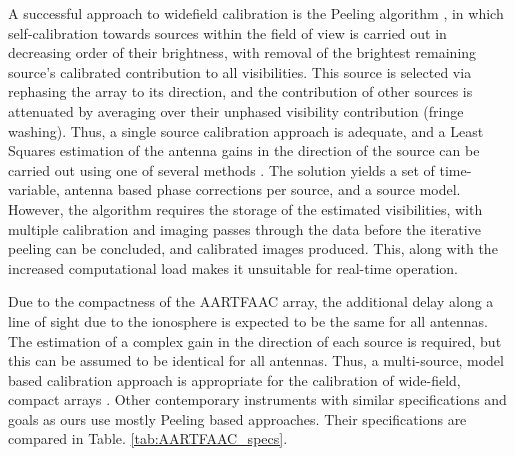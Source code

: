 \documentclass{aa}
\begin{document}
A  successful  approach  to  widefield  calibration  is  the  Peeling  algorithm
\citep{noordam2004peel,vdTol2007selfcallofar}, in which self-calibration towards
sources within  the field of  view is carried  out in decreasing order  of their
brightness,  with  removal  of   the  brightest  remaining  source's  calibrated
contribution  to all  visibilities. This  source is  selected via  rephasing the
array to its  direction, and the contribution of other  sources is attenuated by
averaging over their unphased  visibility contribution (fringe washing). Thus, a
single source calibration  approach is adequate, and a  Least Squares estimation
of the antenna gains in the direction of the source can be carried out using one
of  several  methods \citep{boonstra2003gain}.  The  solution  yields  a set  of
time-variable,  antenna  based  phase  corrections  per  source,  and  a  source
model.   However,  the  algorithm   requires  the   storage  of   the  estimated
visibilities,  with multiple  calibration and  imaging passes  through  the data
before  the   iterative  peeling  can   be  concluded,  and   calibrated  images
produced. This, along with the  increased computational load makes it unsuitable
for real-time operation.

Due to the compactness of the  AARTFAAC array, the additional delay along a line
of sight due to the ionosphere is  expected to be the same for all antennas. The
estimation of  a complex gain in the  direction of each source  is required, but
this can  be assumed  to be  identical for all  antennas. Thus,  a multi-source,
model  based  calibration  approach   is  appropriate  for  the  calibration  of
wide-field, compact arrays \citep{wijnholds2010calibration}.  Other contemporary
instruments with  similar specifications  and goals as  ours use  mostly Peeling
based    approaches.    Their    specifications   are    compared    in   Table.
\ref{tab:AARTFAAC_specs}.
\end{document}
